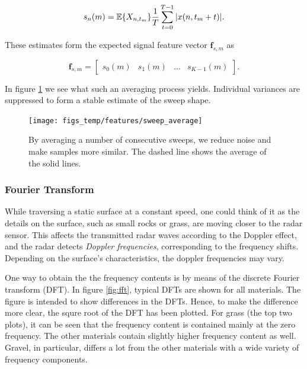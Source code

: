\begin{equation}
	s_n(m) = \operatorname*{\mathbb{E}}\{X_{n,t_m}\}\frac{1}{T}\sum_{t=0}^{T-1}|x(n, t_m + t)|.
\end{equation}

These estimates form the expected signal feature vector $\mathbf{f}_{s,m}$ as 

\begin{equation}
	\mathbf{f}_{s,m} = 
	\begin{bmatrix}
		s_0(m) & s_1(m) & ... & s_{K-1}(m)
	\end{bmatrix}.
\end{equation}


In figure \ref{fig:sweep_average} we see what such an averaging process yields. Individual variances are suppressed to form a stable estimate of the sweep shape. 

\begin{figure}[h]
	\centering
	\texttt{[image: figs\_temp/features/sweep\_average]}
	\caption{By averaging a number of consecutive sweeps, we reduce noise and make samples more similar. The dashed line shows the average of the solid lines. }
	\label{fig:sweep_average}
\end{figure}


\subsubsection{Fourier Transform}
While traversing a static surface at a constant speed, one could think of it as the details on the surface, such as small rocks or grass, are moving closer to the radar sensor. This affects the transmitted radar waves according to the Doppler effect, and the radar detects \textit{Doppler frequencies}, corresponding to the frequency shifts. Depending on the surface's characteristics, the doppler frequencies may vary. 

One way to obtain the the frequency contents is by means of the discrete Fourier transform (DFT). In figure \ref{fig:fft}, typical DFTs are shown for all materials. The figure is intended to show differences in the DFTs. Hence, to make the difference more clear, the squre root of the DFT has been plotted. For grass (the top two plots), it can be seen that the frequency content is contained mainly at the zero frequency. The other materials contain slightly higher frequency content as well. Gravel, in particular, differs a lot from the other materials with a wide variety of frequency components.

